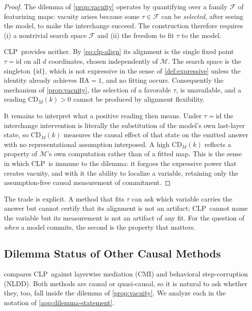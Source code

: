 \documentclass[11pt]{article}
\newcommand{\CDM}{\mathrm{CD}_{M}}
\newcommand{\stepk}{k}
\newcommand{\CLP}{\textsc{CLP}}
\begin{document}
\begin{proof}
The dilemma of \cref{prop:vacuity} operates by quantifying over a family
$\mathcal{F}$ of featurizing maps: vacuity arises because some $\tau\in\mathcal{F}$
can be \emph{selected}, after seeing the model, to make the interchange succeed.
The construction therefore requires (i) a nontrivial search space $\mathcal{F}$
and (ii) the freedom to fit $\tau$ to the model.

\CLP\ provides neither. By \cref{eq:clp-align} its alignment is the single fixed
point $\tau=\mathrm{id}$ on all $d$ coordinates, chosen independently of
$\mathcal{M}$. The search space is the singleton $\{\mathrm{id}\}$, which is not
expressive in the sense of \cref{def:expressive} unless the identity already
achieves $\mathrm{IIA}=1$, and no fitting occurs. Consequently the mechanism of
\cref{prop:vacuity}, the selection of a favorable $\tau$, is unavailable, and a
reading $\CDM(\stepk)>0$ cannot be produced by alignment flexibility.

It remains to interpret what a positive reading then means. Under
$\tau=\mathrm{id}$ the interchange intervention is literally the substitution of
the model's own last-layer state, so $\CDM(\stepk)$ measures the causal effect
of that state on the emitted answer with no representational assumption
interposed. A high $\CDM(\stepk)$ reflects a property of $\mathcal{M}$'s own
computation rather than of a fitted map. This is the sense in which \CLP\ is
immune to the dilemma: it forgoes the expressive power that creates vacuity, and
with it the ability to localize a variable, retaining only the
assumption-free causal measurement of commitment.
\end{proof}

The trade is explicit. A method that fits $\tau$ can ask which variable carries
the answer but cannot certify that its alignment is not an artifact; \CLP\ cannot
name the variable but its measurement is not an artifact of any fit. For the
question of \emph{when} a model commits, the second is the property that
matters.

\subsection{Dilemma Status of Other Causal Methods}
\label{app:dilemma-others}

 compares \CLP\ against layerwise mediation (CMI) and
behavioral step-corruption (NLDD). Both methods are causal or quasi-causal, so
it is natural to ask whether they, too, fall inside the dilemma of
\cref{prop:vacuity}. We analyze each in the notation of \cref{app:dilemma-statement}.
\end{document}
